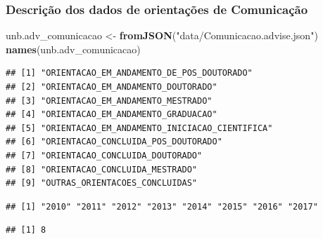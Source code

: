\documentclass[]{article}
\newenvironment{Shaded}{\begin{snugshade}}{\end{snugshade}}
\newcommand{\KeywordTok}[1]{\textcolor[rgb]{0.13,0.29,0.53}{\textbf{#1}}}
\newcommand{\DataTypeTok}[1]{\textcolor[rgb]{0.13,0.29,0.53}{#1}}
\newcommand{\StringTok}[1]{\textcolor[rgb]{0.31,0.60,0.02}{#1}}
\newcommand{\OperatorTok}[1]{\textcolor[rgb]{0.81,0.36,0.00}{\textbf{#1}}}
\newcommand{\NormalTok}[1]{#1}
\begin{document}
\subsubsection{Descrição dos dados de orientações de
Comunicação}\label{descricao-dos-dados-de-orientacoes-de-comunicacao}

\begin{Shaded}
\begin{Highlighting}[]
\NormalTok{unb.adv_comunicacao <-}\StringTok{ }\KeywordTok{fromJSON}\NormalTok{(}\StringTok{"data/Comunicacao.advise.json"}\NormalTok{)}
\KeywordTok{names}\NormalTok{(unb.adv_comunicacao)}
\end{Highlighting}
\end{Shaded}

\begin{verbatim}
## [1] "ORIENTACAO_EM_ANDAMENTO_DE_POS_DOUTORADO"    
## [2] "ORIENTACAO_EM_ANDAMENTO_DOUTORADO"           
## [3] "ORIENTACAO_EM_ANDAMENTO_MESTRADO"            
## [4] "ORIENTACAO_EM_ANDAMENTO_GRADUACAO"           
## [5] "ORIENTACAO_EM_ANDAMENTO_INICIACAO_CIENTIFICA"
## [6] "ORIENTACAO_CONCLUIDA_POS_DOUTORADO"          
## [7] "ORIENTACAO_CONCLUIDA_DOUTORADO"              
## [8] "ORIENTACAO_CONCLUIDA_MESTRADO"               
## [9] "OUTRAS_ORIENTACOES_CONCLUIDAS"
\end{verbatim}

\begin{Shaded}
\end{Shaded}

\begin{verbatim}
## [1] "2010" "2011" "2012" "2013" "2014" "2015" "2016" "2017"
\end{verbatim}

\begin{Shaded}
\end{Shaded}

\begin{verbatim}
## [1] 8
\end{verbatim}
\end{document}

